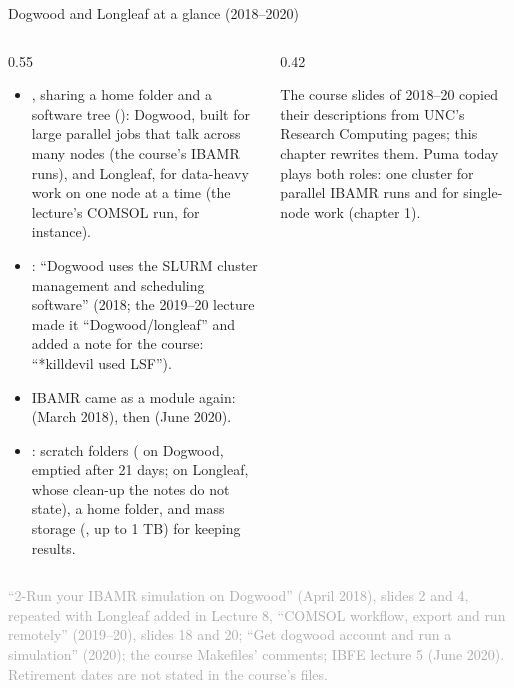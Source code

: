 \documentclass[aspectratio=169,11pt]{beamer}
\newcommand{\sourcecredit}[1]{\vfill\begin{flushright}\tiny\textcolor{DarkGray}{#1}\end{flushright}}
\begin{document}
\begin{frame}{Dogwood and Longleaf at a glance (2018--2020)}
\label{fr:dwglance}
\begin{columns}[T,onlytextwidth]
\begin{column}{0.55\textwidth}
\footnotesize
\begin{itemize}\setlength{\itemsep}{1.5pt}
  \item {}, sharing a home folder and a software tree (): Dogwood, built for large parallel jobs that talk across many nodes (the course's IBAMR runs), and Longleaf, for data-heavy work on one node at a time (the lecture's COMSOL run, for instance).
  \item {}: ``Dogwood uses the SLURM cluster management and scheduling software'' (2018; the 2019--20 lecture made it ``Dogwood/longleaf'' and added a note for the course: ``*killdevil used LSF'').
  \item IBAMR came as a module again:  (March 2018), then  (June 2020).
  \item {}: scratch folders ( on Dogwood, emptied after 21 days;  on Longleaf, whose clean-up the notes do not state), a home folder, and mass storage (, up to 1 TB) for keeping results.
\end{itemize}
\end{column}
\begin{column}{0.42\textwidth}
\begin{punchbox}
\small The course slides of 2018--20 copied their descriptions from UNC's Research Computing pages; this chapter rewrites them. Puma today plays both roles: one cluster for parallel IBAMR runs and for single-node work (chapter 1).
\end{punchbox}
\end{column}
\end{columns}
\sourcecredit{``2-Run your IBAMR simulation on Dogwood'' (April 2018), slides 2 and 4, repeated with Longleaf added in Lecture 8, ``COMSOL workflow, export and run remotely'' (2019--20), slides 18 and 20; ``Get dogwood account and run a simulation'' (2020); the course Makefiles' comments; IBFE lecture 5 (June 2020). Retirement dates are not stated in the course's files.}
\end{frame}
\end{document}
